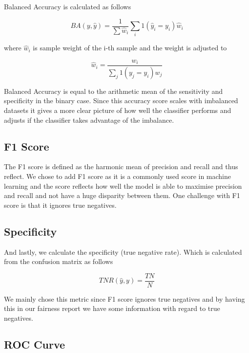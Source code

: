 Balanced Accuracy is calculated as follows

\begin{equation*}
    BA(y, \hat{y}) = \frac{1}{\sum \hat{w}_i} \sum_i 1(\hat{y}_i = y_i)\hat{w}_i
\end{equation*}

where $\hat{w}_i$ is sample weight of the i-th sample and the weight is adjusted to 

\begin{equation*}
    \hat{w}_i = \frac{w_i}{\sum_j 1(y_j = y_i)w_j}
\end{equation*}

Balanced Accuracy is equal to the arithmetic mean of the sensitivity and specificity in the binary case. Since this accuracy score scales with imbalanced datasets it gives a more clear picture of how well the classifier performs and adjusts if the classifier takes advantage of the imbalance.

\subsection{F1 Score}

The F1 score is defined as the harmonic mean of precision and recall and thus reflect. We chose to add F1 score as it is a commonly used score in machine learning and the score reflects how well the model is able to maximise precision and recall and not have a huge disparity between them. One challenge with F1 score is that it ignores true negatives. 

\subsection{Specificity}

And lastly, we calculate the specificity (true negative rate). Which is calculated from the confusion matrix as follows

\begin{equation*}
    TNR(\hat{y}, y) = \frac{TN}{N}
\end{equation*}

We mainly chose this metric since F1 score ignores true negatives and by having this in our fairness report we have some information with regard to true negatives.

\subsection{ROC Curve}

